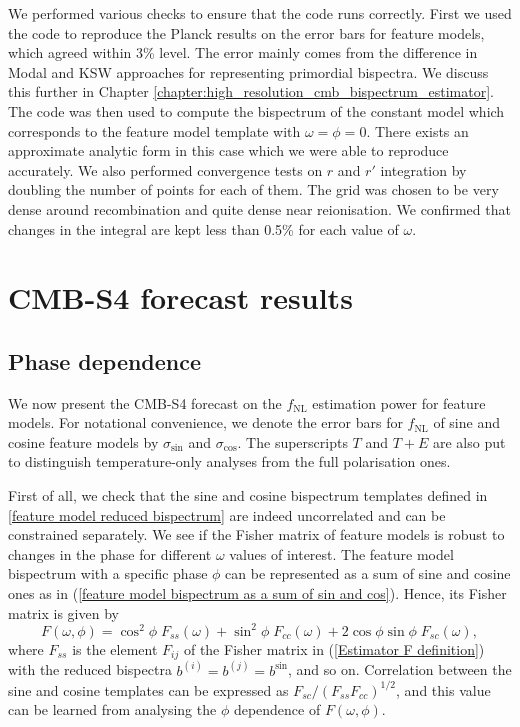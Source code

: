 We performed various checks to ensure that the code runs correctly. First we used the code to reproduce the Planck results on the error bars for feature models, which agreed within 3\% level. The error mainly comes from the difference in Modal and KSW approaches for representing primordial bispectra. We discuss this further in Chapter \ref{chapter:high_resolution_cmb_bispectrum_estimator}. The code was then used to compute the bispectrum of the constant model which corresponds to the feature model template with $\omega=\phi=0$. There exists an approximate analytic form in this case \cite{Fergusson2012} which we were able to reproduce accurately. We also performed convergence tests on $r$ and $r'$ integration by doubling the number of points for each of them. The grid was chosen to be very dense around recombination and quite dense near reionisation. We confirmed that changes in the integral are kept less than 0.5\% for each value of $\omega$.


\section{CMB-S4 forecast results} \label{section: CMB-S4 forecast results}
\subsection{Phase dependence}

We now present the CMB-S4 forecast on the $f_\text{NL}$ estimation power for feature models. For notational convenience, we denote the error bars for $f_\text{NL}$ of sine and cosine feature models by $\sigma_{\sin}$ and $\sigma_{\cos}$. The superscripts $T$ and $T+E$ are also put to distinguish temperature-only analyses from the full polarisation ones.

First of all, we check that the sine and cosine bispectrum templates defined in \eqref{feature model reduced bispectrum} are indeed uncorrelated and can be constrained separately. We see if the Fisher matrix of feature models is robust to changes in the phase for different $\omega$ values of interest. The feature model bispectrum with a specific phase $\phi$ can be represented as a sum of sine and cosine ones as in (\ref{feature model bispectrum as a sum of sin and cos}). Hence, its Fisher matrix is given by
\begin{equation}
	F(\omega, \phi) = \cos^2\phi \; F_{ss}(\omega) + \sin^2\phi \; F_{cc}(\omega) + 2\cos\phi\sin\phi \; F_{sc}(\omega),
\end{equation}
where $F_{ss}$ is the element $F_{ij}$ of the Fisher matrix in (\ref{Estimator F definition}) with the reduced bispectra $b^{(i)} = b^{(j)} = b^{\sin}$, and so on. Correlation between the sine and cosine templates can be expressed as $F_{sc}/(F_{ss}F_{cc})^{1/2}$, and this value can be learned from analysing the $\phi$ dependence of $F(\omega,\phi)$.


